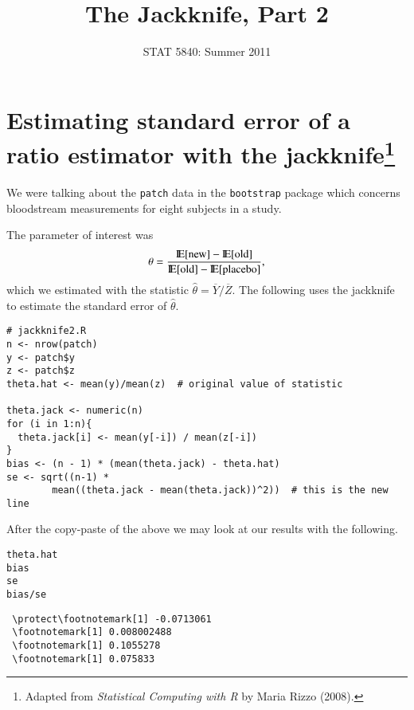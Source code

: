 \documentclass[11pt,english]{article}
\title{The Jackknife, Part 2}
\date{STAT 5840: Summer 2011}
\begin{document}
\maketitle

\thispagestyle{empty}

\section*{Estimating standard error of a ratio estimator with the jackknife\footnote{Adapted from \emph{Statistical Computing with R} by Maria Rizzo (2008). }}
\label{sec-1}

We were talking about the \texttt{patch} data in the \texttt{bootstrap} package which concerns bloodstream measurements for eight subjects in a study. 



The parameter of interest was
\[
\theta = \frac{\mathrm{I\hspace{-1.5pt}E}[\mathrm{new}] - \mathrm{I\hspace{-1.5pt}E}[\mathrm{old}]}{\mathrm{I\hspace{-1.5pt}E}[\mathrm{old}] - \mathrm{I\hspace{-1.5pt}E}[\mathrm{placebo}]},
\]
which we estimated with the statistic \(\hat{\theta} = \overline{Y}/\overline{Z}\).  The following uses the jackknife to estimate the standard error of $\hat{\theta}$.


\begin{verbatim}
# jackknife2.R
n <- nrow(patch)
y <- patch$y
z <- patch$z
theta.hat <- mean(y)/mean(z)  # original value of statistic

theta.jack <- numeric(n)
for (i in 1:n){
  theta.jack[i] <- mean(y[-i]) / mean(z[-i])
}
bias <- (n - 1) * (mean(theta.jack) - theta.hat)
se <- sqrt((n-1) *
        mean((theta.jack - mean(theta.jack))^2))  # this is the new line
\end{verbatim}




After the copy-paste of the above we may look at our results with the following.

\begin{verbatim}
theta.hat
bias
se
bias/se
\end{verbatim}




\begin{verbatim}
 \protect\footnotemark[1] -0.0713061
 \footnotemark[1] 0.008002488
 \footnotemark[1] 0.1055278
 \footnotemark[1] 0.075833
\end{verbatim}
\end{document}
